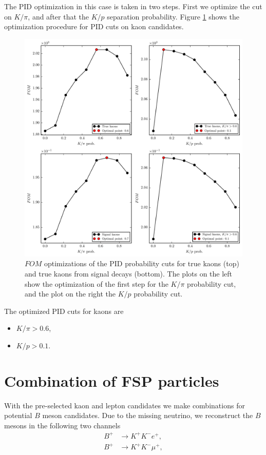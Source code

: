 \documentclass[oneside,a4paper,openany,12pt]{scrbook}
\begin{document}
The PID optimization in this case is taken in two steps. First we optimize the cut on $K / \pi$, and after that the $K/p$ separation probability. Figure \ref{fig:Kfom} shows the optimization procedure for PID cuts on kaon candidates.

\begin{figure}[H]
\centering
\captionsetup{width=.8\linewidth}
\includegraphics[width=\linewidth]{fig/FSP_kaon_fom}
\caption{$FOM$ optimizations of the PID probability cuts for true kaons (top) and true kaons from signal decays (bottom). The plots on the left show the optimization of the first step for the $K / \pi$ probability cut, and the plot on the right the $K/p$ probability cut.}
\label{fig:Kfom}
\end{figure}

The optimized PID cuts for kaons are
\begin{itemize}
\item $K/\pi > 0.6$,
\item $K/p > 0.1$.
\end{itemize}

\section{Combination of FSP particles}

With the pre-selected kaon and lepton candidates we make combinations for potential $B$ meson candidates. Due to the missing neutrino, we reconstruct the $B$ mesons in the following two channels
\begin{align*}
B^+ &\to K^+ K^- e^+, \\
B^+ &\to K^+ K^- \mu^+,
\end{align*}
\end{document}
